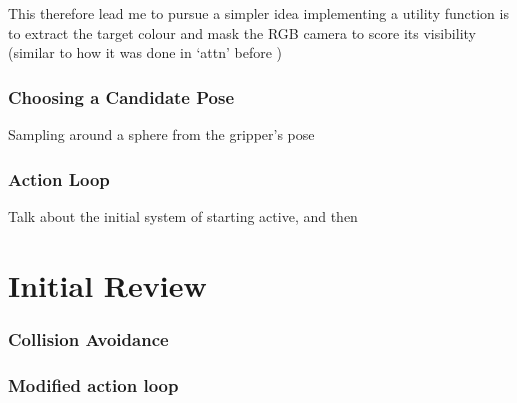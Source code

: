 This therefore lead me to pursue a simpler idea implementing a utility function is to extract the target colour and mask the RGB camera to score its visibility (similar to how it was done in `attn' before )





\subsubsection{Choosing a Candidate Pose}
Sampling around a sphere from the gripper's pose

\subsubsection{Action Loop}
Talk about the initial system of starting active, and then 

\section{Initial Review}

\subsubsection{Collision Avoidance}

\subsubsection{Modified action loop}


  